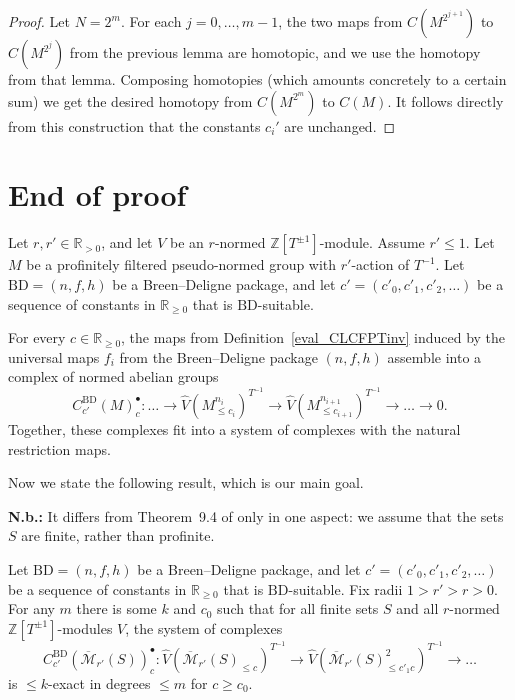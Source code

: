 \begin{proof} Let $N=2^m$. For each $j=0,\ldots,m-1$, the two maps from $C(M^{2^{j+1}})$ to $C(M^{2^j})$ from the previous lemma are homotopic, and we use the homotopy from that lemma. Composing homotopies (which amounts concretely to a certain sum) we get the desired homotopy from $C(M^{2^m})$ to $C(M)$. It follows directly from this construction that the constants $c_i'$ are unchanged.
\end{proof}

\section{End of proof}

\begin{definition}
  \label{BD_system}
  \leanok
  Let $r, r' \in \mathbb R_{>0}$,
  and let $V$ be an $r$-normed $\mathbb Z[T^{\pm 1}]$-module.
  Assume $r' \le 1$.
  Let $M$ be a profinitely filtered pseudo-normed group with $r'$-action of $T^{-1}$.
  Let $\text{BD} = (n,f,h)$ be a Breen--Deligne package,
  and let $c' = (c'_0, c'_1, c'_2, \dots)$ be a sequence of constants in $\mathbb R_{\ge 0}$
  that is $\text{BD}$-suitable.

  For every $c \in \mathbb R_{\ge 0}$,
  the maps from Definition~\ref{eval_CLCFPTinv}
  induced by the universal maps $f_i$ from the Breen--Deligne package $(n,f,h)$
  assemble into a complex of normed abelian groups
  \[
    C^{\text{BD}}_{c'}(M)_c^\bullet \colon
    \dots \to
    \hat V(M_{\le c_i}^{n_i})^{T^{-1}}
    \to
    \hat V(M_{\le c_{i+1}}^{n_{i+1}})^{T^{-1}}
    \to \dots \to 0.
  \]
  Together, these complexes fit into a system of complexes
  with the natural restriction maps.
\end{definition}

Now we state the following result, which is our main goal.

\textbf{N.b.:}
It differs from Theorem~9.4 of \cite{Analytic} only in one aspect:
we assume that the sets $S$ are finite, rather than profinite.

\begin{theorem}
  \label{first_target}
  \leanok
  Let $\text{BD} = (n,f,h)$ be a Breen--Deligne package,
  and let $c' = (c'_0, c'_1, c'_2, \dots)$ be a sequence of constants in $\mathbb R_{\ge 0}$
  that is $\text{BD}$-suitable.
	Fix radii $1>r'>r>0$.
  For any $m$ there is some $k$ and $c_0$ such that for all finite sets $S$ and all $r$-normed $\mathbb Z[T^{\pm 1}]$-modules $V$,
  the system of complexes
  \[
    C^{\text{BD}}_{c'}(\overline{\mathcal M}_{r'}(S))_c^\bullet \colon
    \widehat{V}(\overline{\mathcal M}_{r'}(S)_{\leq c})^{T^{-1}} \to
    \widehat{V}(\overline{\mathcal M}_{r'}(S)_{\leq c'_1c}^2)^{T^{-1}}
    \to \ldots
  \]
  is $\leq k$-exact in degrees $\leq m$ for $c\geq c_0$.
\end{theorem}

